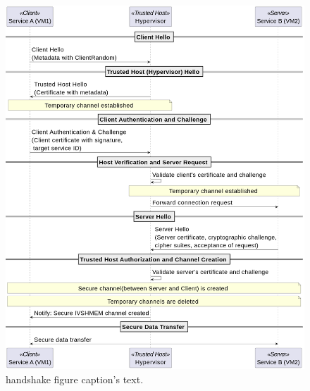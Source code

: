 \documentclass[conference]{IEEEtran}
\begin{document}
\begin{figure}[ht]
  \begin{center}
    \includegraphics[width=1.0\linewidth]{./figures/ivshmem_handshake.png}
  \end{center}
  \caption{\label{fig:handshake} handshake figure
    caption's text. }
\end{figure}
\end{document}
